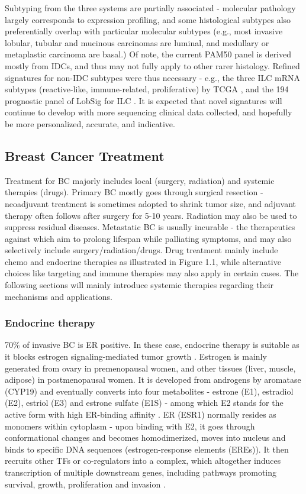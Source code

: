 Subtyping from the three systems are partially associated - molecular pathology largely corresponds to expression profiling, and some histological subtypes also preferentially overlap with particular molecular subtypes (e.g., most invasive lobular, tubular and mucinous carcinomas are luminal, and medullary or metaplastic carcinoma are basal.) Of note, the current PAM50 panel is derived mostly from IDCs, and thus may not fully apply to other rarer histology. Refined signatures for non-IDC subtypes were thus necessary - e.g., the three ILC mRNA subtypes (reactive-like, immune-related, proliferative) by TCGA \citep{ciriello2015comprehensive}, and the 194 prognostic panel of LobSig for ILC \citep{mccart2019lobsig}. It is expected that novel signatures will continue to develop with more sequencing clinical data collected, and hopefully be more personalized, accurate, and indicative. 


\subsection{Breast Cancer Treatment}

Treatment for BC majorly includes local (surgery, radiation) and systemic therapies (drugs). Primary BC mostly goes through surgical resection - neoadjuvant treatment is sometimes adopted to shrink tumor size, and adjuvant therapy often follows after surgery for 5-10 years. Radiation may also be used to suppress residual diseases. Metastatic BC is usually incurable - the therapeutics against which aim to prolong lifespan while palliating symptoms, and may also selectively include surgery/radiation/drugs. Drug treatment mainly include chemo and endocrine therapies as illustrated in Figure 1.1, while alternative choices like targeting and immune therapies may also apply in certain cases. The following sections will mainly introduce systemic therapies regarding their mechanisms and applications.

\subsubsection{Endocrine therapy}

70\% of invasive BC is ER positive. In these case, endocrine therapy is suitable as it blocks estrogen signaling-mediated tumor growth \citep{lumachi2013treatment}. Estrogen is mainly generated from ovary in premenopausal women, and other tissues (liver, muscle, adipose) in postmenopausal women. It is developed from androgens by aromatase (CYP19) and eventually converts into four metabolites - estrone (E1), estradiol (E2), estriol (E3) and estrone sulfate (E1S) - among which E2 stands for the active form with high ER-binding affinity \citep{lonning2011exploring}. ER (ESR1) normally resides as monomers within cytoplasm - upon binding with E2, it goes through conformational changes and becomes homodimerized, moves into nucleus and binds to specific DNA sequences (estrogen-response elements (EREs)). It then recruits other TFs or co-regulators into a complex, which altogether induces transcription of multiple downstream genes, including pathways promoting survival, growth, proliferation and invasion \citep{song2006membrane}. 

